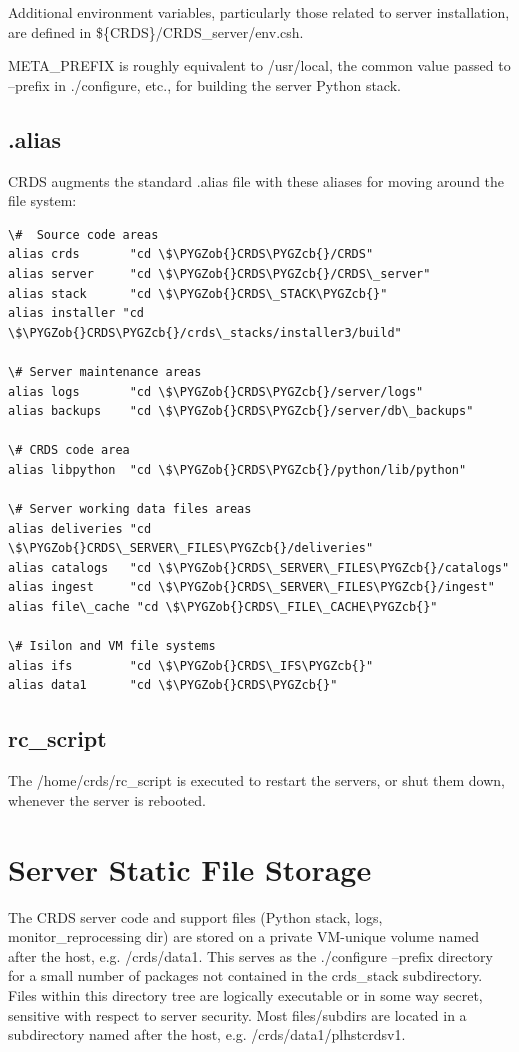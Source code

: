 \documentclass[letterpaper,10pt,english]{sphinxmanual}
\def\PYGZob{\char`\{}
\def\PYGZcb{\char`\}}
\begin{document}
Additional environment variables, particularly those related to server installation, are defined in
\$\{CRDS\}/CRDS\_server/env.csh.

META\_PREFIX is roughly equivalent to /usr/local,  the common value passed to --prefix in ./configure,  etc.,
for building the server Python stack.


\subsection{.alias}
\label{server_guide:alias}
CRDS augments the standard .alias file with these aliases for moving around the file system:

\begin{Verbatim}[commandchars=\\\{\}]
\#  Source code areas
alias crds       "cd \$\PYGZob{}CRDS\PYGZcb{}/CRDS"
alias server     "cd \$\PYGZob{}CRDS\PYGZcb{}/CRDS\_server"
alias stack      "cd \$\PYGZob{}CRDS\_STACK\PYGZcb{}"
alias installer "cd \$\PYGZob{}CRDS\PYGZcb{}/crds\_stacks/installer3/build"

\# Server maintenance areas
alias logs       "cd \$\PYGZob{}CRDS\PYGZcb{}/server/logs"
alias backups    "cd \$\PYGZob{}CRDS\PYGZcb{}/server/db\_backups"

\# CRDS code area
alias libpython  "cd \$\PYGZob{}CRDS\PYGZcb{}/python/lib/python"

\# Server working data files areas
alias deliveries "cd \$\PYGZob{}CRDS\_SERVER\_FILES\PYGZcb{}/deliveries"
alias catalogs   "cd \$\PYGZob{}CRDS\_SERVER\_FILES\PYGZcb{}/catalogs"
alias ingest     "cd \$\PYGZob{}CRDS\_SERVER\_FILES\PYGZcb{}/ingest"
alias file\_cache "cd \$\PYGZob{}CRDS\_FILE\_CACHE\PYGZcb{}"

\# Isilon and VM file systems
alias ifs        "cd \$\PYGZob{}CRDS\_IFS\PYGZcb{}"
alias data1      "cd \$\PYGZob{}CRDS\PYGZcb{}"
\end{Verbatim}


\subsection{rc\_script}
\label{server_guide:rc-script}
The /home/crds/rc\_script is executed to restart the servers,  or shut them down,  whenever the server is rebooted.


\section{Server Static File Storage}
\label{server_guide:server-static-file-storage}
The CRDS server code and support files (Python stack, logs, monitor\_reprocessing dir) are stored on
a private VM-unique volume named after the host,  e.g.  /crds/data1.  This serves as the
./configure --prefix directory for a small number of packages not contained in the crds\_stack subdirectory.
Files within this directory tree are logically executable or in some way secret,  sensitive with respect
to server security.   Most files/subdirs are located in a subdirectory named after the host,
e.g. /crds/data1/plhstcrdsv1.
\end{document}
